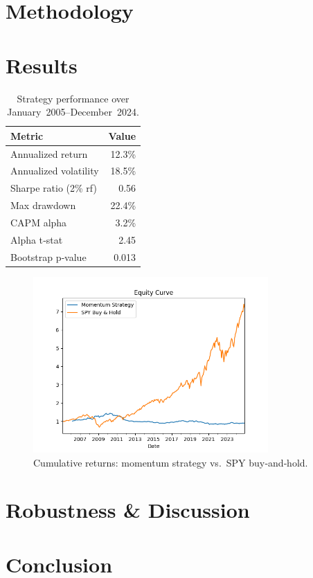 \documentclass[11pt]{article}
\begin{document}
\section{Methodology} \label{sec:method}

\section{Results} \label{sec:results}
\begin{table}[h!]
  \centering
  \begin{tabular}{l r}
    \toprule
    Metric                  & Value     \\
    \midrule
    Annualized return       & 12.3\%    \\
    Annualized volatility   & 18.5\%    \\
    Sharpe ratio (2\% rf)   & 0.56      \\
    Max drawdown            & 22.4\%    \\
    CAPM alpha              & 3.2\%     \\
    Alpha t‑stat            & 2.45      \\
    Bootstrap p‑value       & 0.013     \\
    \bottomrule
  \end{tabular}
  \caption{Strategy performance over January 2005–December 2024.}
\end{table}

\begin{figure}[h!]
  \centering
  \includegraphics[width=0.8\textwidth]{figures/equity_curve.png}
  \caption{Cumulative returns: momentum strategy vs.\ SPY buy‑and‑hold.}
\end{figure}

\section{Robustness \& Discussion} \label{sec:robust}

\section{Conclusion} \label{sec:concl}



\end{document}

